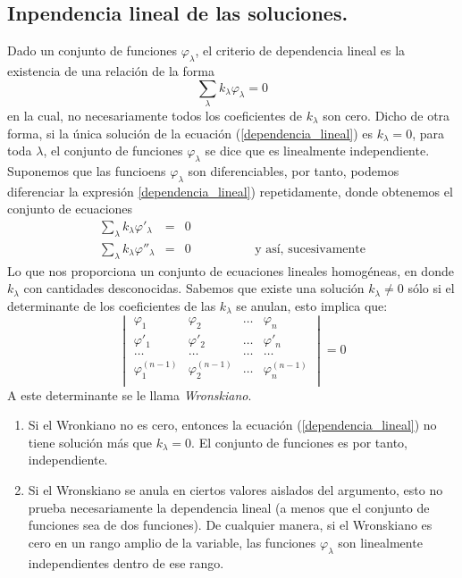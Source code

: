 \subsection{Inpendencia lineal de las soluciones.}
Dado  un conjunto de funciones $\varphi_{\lambda}$, el criterio de dependencia lineal es la existencia de una relación de la forma
\begin{equation}
\sum_{\lambda} k_{\lambda} \varphi_{\lambda} = 0 \label{dependencia_lineal}
\end{equation}
en la cual, no necesariamente todos los coeficientes de $k_{\lambda}$ son cero. Dicho de otra forma, si la única solución de la ecuación (\ref{dependencia_lineal}) es $k_{\lambda} = 0$, para toda $\lambda$, el conjunto de funciones $\varphi_{\lambda}$ se dice que es linealmente independiente.
\\
Suponemos que las funcioens $\varphi_{\lambda}$ son diferenciables, por tanto, podemos diferenciar la expresión \ref{dependencia_lineal}) repetidamente, donde obtenemos el conjunto de ecuaciones
\begin{eqnarray}
\sum_{\lambda} k_{\lambda} \varphi'_{\lambda} &=& 0 \\
\sum_{\lambda} k_{\lambda} \varphi''_{\lambda} &=& 0 \hspace{2cm} \text{ y así, sucesivamente} 
\end{eqnarray}
Lo que nos proporciona un conjunto de ecuaciones lineales homogéneas, en donde $k_{\lambda}$ con cantidades desconocidas. Sabemos que existe una solución $k_{\lambda} \neq 0$ sólo si el determinante de los coeficientes de las $k_{\lambda}$ se anulan, esto implica que:
\begin{equation}
\begin{vmatrix}
\varphi_{1} & \varphi_{2} & \ldots & \varphi_{n} \\
\varphi'_{1} & \varphi'_{2} & \ldots & \varphi'_{n} \\
\ldots & \ldots & \ldots & \ldots \\
\varphi^{(n-1)}_{1} & \varphi^{(n-1)}_{2} & \ldots & \varphi^{(n-1)}_{n} \\
\end{vmatrix} = 0
\end{equation}
A este determinante se le llama \emph{Wronskiano}.
\begin{enumerate}
\item Si el Wronkiano no es cero, entonces la ecuación (\ref{dependencia_lineal}) no tiene solución más que $k_{\lambda}=0$. El conjunto de funciones es por tanto, independiente.
\item Si el Wronskiano se anula en ciertos valores aislados del argumento, esto no prueba necesariamente la dependencia lineal (a menos que el conjunto de funciones sea de dos funciones). De cualquier manera, si el Wronskiano es cero en un rango amplio de la variable, las funciones $\varphi_{\lambda}$ son linealmente independientes dentro de ese rango.
\end{enumerate}
